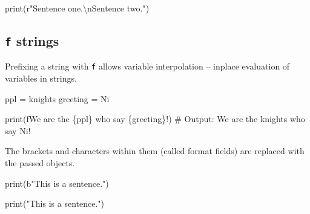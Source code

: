 \documentclass[
  letterpaper,
  DIV=11,
  numbers=noendperiod]{scrreprt}
\newenvironment{Shaded}{\begin{snugshade}}{\end{snugshade}}
\newcommand{\BuiltInTok}[1]{\textcolor[rgb]{0.00,0.23,0.31}{#1}}
\newcommand{\CommentTok}[1]{\textcolor[rgb]{0.37,0.37,0.37}{#1}}
\newcommand{\NormalTok}[1]{\textcolor[rgb]{0.00,0.23,0.31}{#1}}
\newcommand{\OperatorTok}[1]{\textcolor[rgb]{0.37,0.37,0.37}{#1}}
\newcommand{\SpecialCharTok}[1]{\textcolor[rgb]{0.37,0.37,0.37}{#1}}
\newcommand{\SpecialStringTok}[1]{\textcolor[rgb]{0.13,0.47,0.30}{#1}}
\newcommand{\StringTok}[1]{\textcolor[rgb]{0.13,0.47,0.30}{#1}}
\newcommand{\VerbatimStringTok}[1]{\textcolor[rgb]{0.13,0.47,0.30}{#1}}
\begin{document}
\begin{Shaded}
\begin{Highlighting}[]
\BuiltInTok{print}\NormalTok{(}\VerbatimStringTok{r"Sentence one.\textbackslash{}nSentence two."}\NormalTok{)}
\end{Highlighting}
\end{Shaded}

\hypertarget{f-strings}{%
\subsection{\texorpdfstring{\texttt{f}
strings}{f strings}}\label{f-strings}}

Prefixing a string with \texttt{f} allows variable interpolation --
inplace evaluation of variables in strings.

\begin{Shaded}
\begin{Highlighting}[]
\NormalTok{ppl }\OperatorTok{=} \StringTok{\textquotesingle{}knights\textquotesingle{}}
\NormalTok{greeting }\OperatorTok{=} \StringTok{\textquotesingle{}Ni\textquotesingle{}}
\end{Highlighting}
\end{Shaded}

\begin{Shaded}
\begin{Highlighting}[]
\BuiltInTok{print}\NormalTok{(}\SpecialStringTok{f\textquotesingle{}We are the }\SpecialCharTok{\{}\NormalTok{ppl}\SpecialCharTok{\}}\SpecialStringTok{ who say }\SpecialCharTok{\{}\NormalTok{greeting}\SpecialCharTok{\}}\SpecialStringTok{!\textquotesingle{}}\NormalTok{) }\CommentTok{\# Output: We are the knights who say Ni!}
\end{Highlighting}
\end{Shaded}

The brackets and characters within them (called format fields) are
replaced with the passed objects.

\begin{Shaded}
\begin{Highlighting}[]
\BuiltInTok{print}\NormalTok{(}\StringTok{b"This is a sentence."}\NormalTok{)}
\end{Highlighting}
\end{Shaded}

\begin{Shaded}
\begin{Highlighting}[]
\BuiltInTok{print}\NormalTok{(}\StringTok{"This is a sentence."}\NormalTok{)}
\end{Highlighting}
\end{Shaded}
\end{document}
